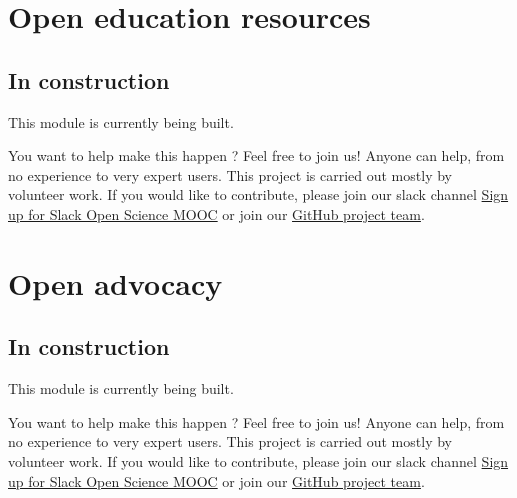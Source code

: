 \documentclass[]{book}
\begin{document}
\hypertarget{module9}{%
\chapter{Open education resources}\label{module9}}

\hypertarget{in-construction-6}{%
\section{In construction}\label{in-construction-6}}

This module is currently being built.

You want to help make this happen ? Feel free to join us! Anyone can help, from no experience to very expert users. This project is carried out mostly by volunteer work. If you would like to contribute, please join our slack channel \href{https://osmooc.herokuapp.com/}{Sign up for Slack Open Science MOOC} or join our \href{https://open-science-mooc-invite.herokuapp.com/}{GitHub project team}.

\hypertarget{module10}{%
\chapter{Open advocacy}\label{module10}}

\hypertarget{in-construction-7}{%
\section{In construction}\label{in-construction-7}}

This module is currently being built.

You want to help make this happen ? Feel free to join us! Anyone can help, from no experience to very expert users. This project is carried out mostly by volunteer work. If you would like to contribute, please join our slack channel \href{https://osmooc.herokuapp.com/}{Sign up for Slack Open Science MOOC} or join our \href{https://open-science-mooc-invite.herokuapp.com/}{GitHub project team}.


\end{document}

